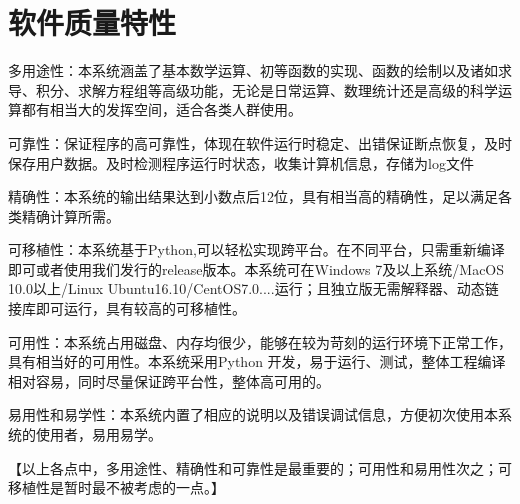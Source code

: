 \chapter{软件质量特性}

多用途性：本系统涵盖了基本数学运算、初等函数的实现、函数的绘制以及诸如求导、积分、求解方程组等高级功能，无论是日常运算、数理统计还是高级的科学运算都有相当大的发挥空间，适合各类人群使用。

可靠性：保证程序的高可靠性，体现在软件运行时稳定、出错保证断点恢复，及时保存用户数据。及时检测程序运行时状态，收集计算机信息，存储为log文件

精确性：本系统的输出结果达到小数点后12位，具有相当高的精确性，足以满足各类精确计算所需。

可移植性：本系统基于Python,可以轻松实现跨平台。在不同平台，只需重新编译即可或者使用我们发行的release版本。本系统可在Windows 7及以上系统/MacOS 10.0以上/Linux Ubuntu16.10/CentOS7.0....运行；且独立版无需解释器、动态链接库即可运行，具有较高的可移植性。

可用性：本系统占用磁盘、内存均很少，能够在较为苛刻的运行环境下正常工作，具有相当好的可用性。本系统采用Python 开发，易于运行、测试，整体工程编译相对容易，同时尽量保证跨平台性，整体高可用的。

易用性和易学性：本系统内置了相应的说明以及错误调试信息，方便初次使用本系统的使用者，易用易学。

【以上各点中，多用途性、精确性和可靠性是最重要的；可用性和易用性次之；可移植性是暂时最不被考虑的一点。】





